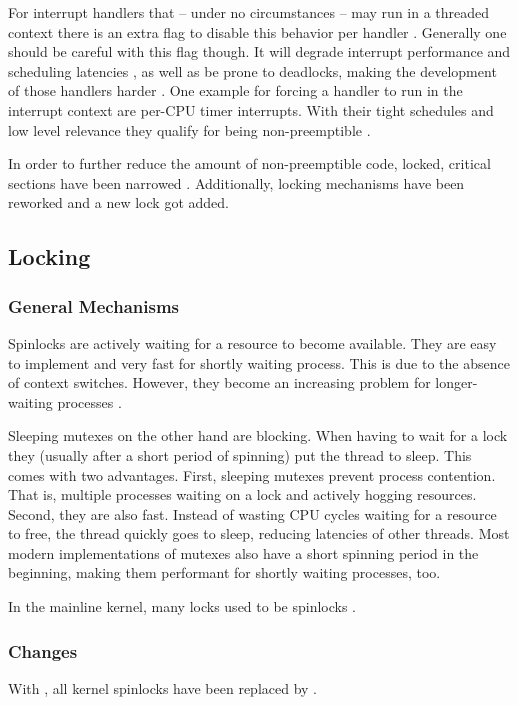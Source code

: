 \documentclass[10pt,twocolumn,a4paper]{article}
\begin{document}
For interrupt handlers that -- under no circumstances -- may run in a threaded context there is an extra flag to disable this behavior per handler \cite{lf:irq}.
Generally one should be careful with this flag though.
It will degrade interrupt performance and scheduling latencies \cite{chyyuu_github_2017, mckenney_realtime_2005}, as well as be prone to deadlocks, making the development of those handlers harder \cite{mckenney_realtime_2005}.
One example for forcing a handler to run in the interrupt context are per-CPU timer interrupts.
With their tight schedules and low level relevance they qualify for being non-preemptible \cite{mckenney_realtime_2005}.
\newline

\noindent In order to further reduce the amount of non-preemptible code, locked, critical sections have been narrowed \cite{mckenney_realtime_2005}.
Additionally, locking mechanisms have been reworked and a new lock got added.

\subsection{Locking}
\subsubsection{General Mechanisms}
Spinlocks are actively waiting for a resource to become available.
They are easy to implement and very fast for shortly waiting process.
This is due to the absence of context switches.
However, they become an increasing problem for longer-waiting processes \cite{lf:sleeping-spinlocks}.

Sleeping mutexes on the other hand are blocking.
When having to wait for a lock they (usually after a short period of spinning) put the thread to sleep.
This comes with two advantages.
First, sleeping mutexes prevent process contention.
That is, multiple processes waiting on a lock and actively hogging resources.
Second, they are also fast.
Instead of wasting CPU cycles waiting for a resource to free, the thread quickly goes to sleep, reducing latencies of other threads.
Most modern implementations of mutexes also have a short spinning period in the beginning, making them performant for shortly waiting processes, too.
\newline

\noindent In the mainline kernel, many locks used to be spinlocks \cite{lf:sleeping-spinlocks}.

\subsubsection{Changes}
With , all  kernel spinlocks have been replaced by .
\end{document}
